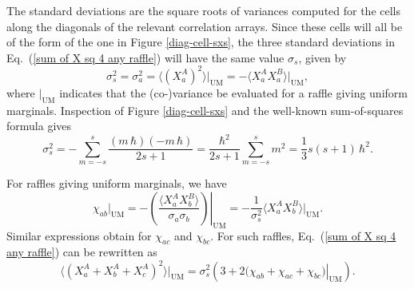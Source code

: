 The standard deviations are the square roots of variances computed for the cells along the diagonals of the relevant correlation arrays. Since these cells will all be of the form of the one in Figure \ref{diag-cell-sxs}, the three standard deviations in Eq.\ (\ref{sum of X sq 4 any raffle}) will have the same value $\sigma_s$, given by  
\begin{equation}
 \sigma_s^2 = \sigma_a^2 = \langle (X^A_a)^2 \rangle  \big|_{\mathrm{UM}}  = - \langle X^A_a X^B_a \rangle   \big|_{\mathrm{UM}}, 
\label{SD for adm raffle 1}
\end{equation}
where $ \big|_{\mathrm{UM}}$ indicates that the (co-)variance be evaluated for a raffle giving uniform marginals. Inspection of Figure \ref{diag-cell-sxs} and the well-known sum-of-squares formula gives
\begin{equation}
\sigma_s^2 = - \sum_{m=-s}^s \! \frac{(m \, \hbar) (-m \, \hbar)}{2s+1} = \frac{\hbar^2}{2s+1} \sum_{m=-s}^s \!\! m^2 =  \frac13 s(s+1) \, \hbar^2.
\label{SD for adm raffle 2}
\end{equation}

For raffles giving uniform marginals, we have
\begin{equation}
\chi_{ab}   \big|_{\mathrm{UM}} = \left. - \left( \frac{\langle X_a^A X_b^B \rangle}{\sigma_a \sigma_b} \right) \right|_{\mathrm{UM}} = - \frac{1}{\sigma_s^2} \langle X_a^A X_b^B \rangle   \big|_{\mathrm{UM}}.\label{chi and covariance adm raffle}
\end{equation}
Similar expressions obtain for $\chi_{ac}$ and $\chi_{bc}$. For such raffles, Eq.\ (\ref{sum of X sq 4 any raffle}) can be rewritten as
\begin{equation}
\langle \left( X_a^A + X_b^A + X_c^A \right)^2 \rangle  \big|_{\mathrm{UM}}
= \sigma_s^2 \left( 3 + 2 \! \left. \big( \chi_{ab} + \chi_{ac} + \chi_{bc} \big) \right|_{\mathrm{UM}} \right).
\label{sum of X sq 4 UM raffle}
\end{equation}

